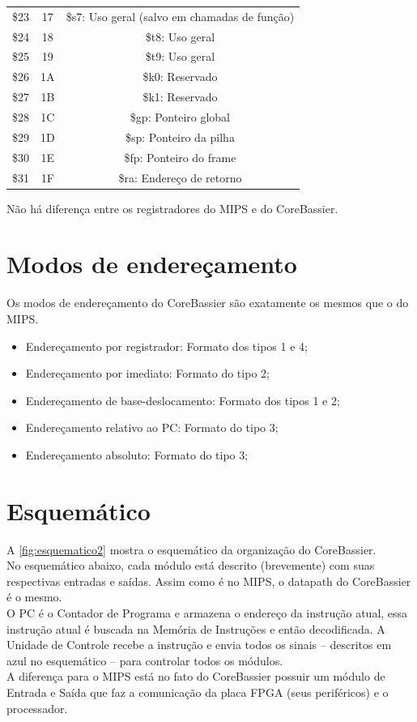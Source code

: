 \documentclass[
	12pt,
	openright,
	a4paper,
	english,			
	french,				
	spanish,			
	brazil,				
	]{abntex2}
\begin{document}
\begin{table}[htb]
\begin{tabular}{ ccc }
 	\$23 & 17 & \$s7: Uso geral (salvo em chamadas de função)\\
 	\$24 & 18 & \$t8: Uso geral\\
 	\$25 & 19 & \$t9: Uso geral\\
 	\$26 & 1A & \$k0: Reservado\\
 	\$27 & 1B & \$k1: Reservado\\
 	\$28 & 1C & \$gp: Ponteiro global\\
 	\$29 & 1D & \$sp: Ponteiro da pilha\\
 	\$30 & 1E & \$fp: Ponteiro do frame\\
 	\$31 & 1F & \$ra: Endereço de retorno\\
  \end{tabular}
\end{table}

Não há diferença entre os registradores do MIPS e do CoreBassier.

\section{Modos de endereçamento}
Os modos de endereçamento do CoreBassier são exatamente os mesmos que o do MIPS.
\begin{itemize}
	\item Endereçamento por registrador: Formato dos tipos 1 e 4;
	\item Endereçamento por imediato: Formato do tipo 2;
	\item Endereçamento de base-deslocamento: Formato dos tipos 1 e 2;
	\item Endereçamento relativo ao PC: Formato do tipo 3;
	\item Endereçamento absoluto: Formato do tipo 3;
\end{itemize}

\section{Esquemático}
A \autoref{fig:esquematico2} mostra o esquemático da organização do CoreBassier.\\
No esquemático abaixo, cada módulo está descrito (brevemente) com suas respectivas entradas e saídas.
Assim como é no MIPS, o datapath do CoreBassier é o mesmo.\\
O PC é o Contador de Programa e armazena o endereço da instrução atual, essa instrução atual é buscada na 
Memória de Instruções e então decodificada. A Unidade de Controle recebe a instrução e envia todos os sinais -- descritos em azul no esquemático --
para controlar todos os módulos.\\
A diferença para o MIPS está no fato do CoreBassier possuir um módulo de Entrada e Saída que faz a comunicação da placa
FPGA (seus periféricos) e o processador.
\end{document}
